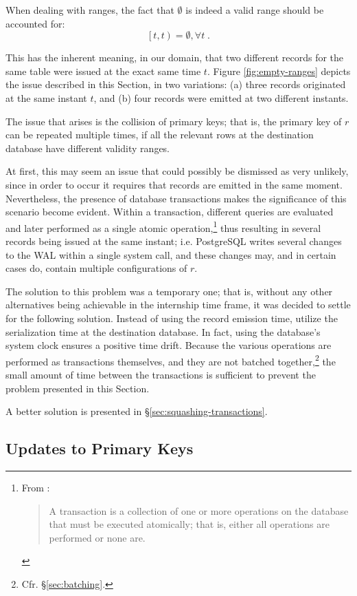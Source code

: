When dealing with ranges, the fact that $\emptyset$ is indeed a valid range should be accounted for:
$$
\left[t, t\right) = \emptyset, \forall t \; .
$$

This has the inherent meaning, in our domain, that two different records for the same table were issued at the exact same time $t$.
Figure \ref{fig:empty-ranges} depicts the issue described in this Section, in two variations: (a) three records originated at the same instant $t$, and (b) four records were emitted at two different instants.

The issue that arises is the collision of primary keys; that is, the primary key of $r$ can be repeated multiple times, if all the relevant rows at the destination database have different validity ranges.

At first, this may seem an issue that could possibly be dismissed as very unlikely, since in order to occur it requires that records are emitted in the same moment.
Nevertheless, the presence of database transactions makes the significance of this scenario become evident.
Within a transaction, different queries are evaluated and later performed as a single atomic operation,\footnote{%
	From \cite[\S 6.6.3]{db-systems}:
	\begin{quote}
		A transaction is a collection of one or more operations on the database that must be executed atomically; that is, either all operations are performed or none are.
	\end{quote}
} thus resulting in several records being issued at the same instant; i.e. PostgreSQL writes several changes to the WAL within a single system call, and these changes may, and in certain cases do, contain multiple configurations of $r$.

The solution to this problem was a temporary one; that is, without any other alternatives being achievable in the internship time frame, it was decided to settle for the following solution.
Instead of using the record emission time, utilize the serialization time at the destination database.
In fact, using the database's system clock ensures a positive time drift.
Because the various operations are performed as transactions themselves, and they are not batched together,\footnote{%
	Cfr. \S \ref{sec:batching}.
} the small amount of time between the transactions is sufficient to prevent the problem presented in this Section.

A better solution is presented in \S \ref{sec:squashing-transactions}.


\subsection{Updates to Primary Keys}

